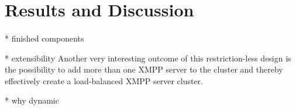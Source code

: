 \section{Results and Discussion}
\label{sec:discussion}
\paragraph{}

* finished components

* extensibility
Another very interesting outcome of this restriction-less design is the possibility to add more than one XMPP server to the cluster and thereby effectively create a load-balanced XMPP server cluster.

* why dynamic

